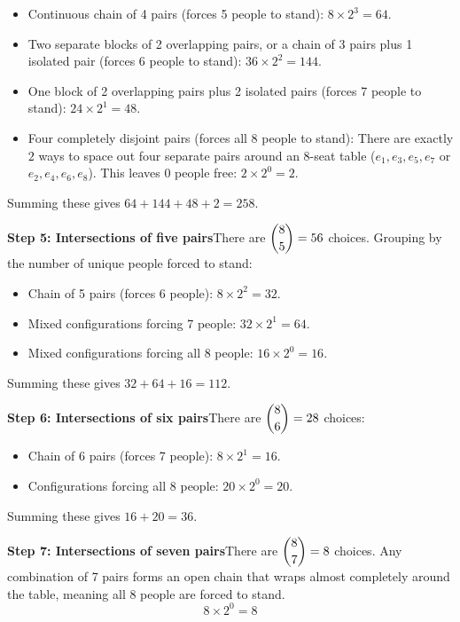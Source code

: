 \begin{enumerate}
 
            \begin{itemize}
        \item Continuous chain of 4 pairs (forces 5 people to stand): $8 \times 2^3 = 64$.
        \item Two separate blocks of 2 overlapping pairs, or a chain of 3 pairs plus 1 isolated pair (forces 6 people to stand): $36 \times 2^2 = 144$.
        \item One block of 2 overlapping pairs plus 2 isolated pairs (forces 7 people to stand): $24 \times 2^1 = 48$.
        \item Four completely disjoint pairs (forces all 8 people to stand): There are exactly $2$ ways to space out four separate pairs around an 8-seat table ($e_1, e_3, e_5, e_7$ or $e_2, e_4, e_6, e_8$). This leaves 0 people free: $2 \times 2^0 = 2$.
            \end{itemize}
            Summing these gives $64 + 144 + 48 + 2 = 258$.

 \textbf{Step 5: Intersections of five pairs}There are $\dbinom{8}{5} = 56$ choices. Grouping by the number of unique people forced to stand:

 
            \begin{itemize}
        \item Chain of 5 pairs (forces 6 people): $8 \times 2^2 = 32$.
        \item Mixed configurations forcing 7 people: $32 \times 2^1 = 64$.
        \item Mixed configurations forcing all 8 people: $16 \times 2^0 = 16$.
            \end{itemize}
            Summing these gives $32 + 64 + 16 = 112$.

 \textbf{Step 6: Intersections of six pairs}There are $\dbinom{8}{6} = 28$ choices:

 
            \begin{itemize}
        \item Chain of 6 pairs (forces 7 people): $8 \times 2^1 = 16$.
        \item Configurations forcing all 8 people: $20 \times 2^0 = 20$.
            \end{itemize}
            Summing these gives $16 + 20 = 36$.

 \textbf{Step 7: Intersections of seven pairs}There are $\dbinom{8}{7} = 8$ choices. Any combination of 7 pairs forms an open chain that wraps almost completely around the table, meaning all $8$ people are forced to stand. 
 \[8 \times 2^0 = 8\]


\end{enumerate}
